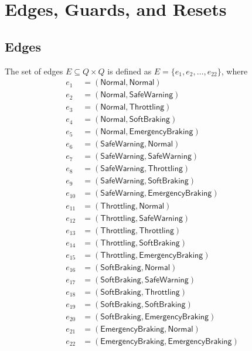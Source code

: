 \documentclass[12pt]{article}
\theoremstyle{definition}
\begin{document}
\section{Edges, Guards, and Resets}

\subsection{Edges}

The set of edges $E \subseteq Q \times Q$ is defined as $E = \{ e_1, e_2, \dots, e_{22} \}$, where
\[
\begin{aligned}
e_1 &= (\mathsf{Normal}, \mathsf{Normal}) \\
e_2 &= (\mathsf{Normal}, \mathsf{SafeWarning}) \\
e_3 &= (\mathsf{Normal}, \mathsf{Throttling}) \\
e_4 &= (\mathsf{Normal}, \mathsf{SoftBraking}) \\
e_5 &= (\mathsf{Normal}, \mathsf{EmergencyBraking}) \\
e_6 &= (\mathsf{SafeWarning}, \mathsf{Normal}) \\
e_7 &= (\mathsf{SafeWarning}, \mathsf{SafeWarning}) \\
e_8 &= (\mathsf{SafeWarning}, \mathsf{Throttling}) \\
e_9 &= (\mathsf{SafeWarning}, \mathsf{SoftBraking}) \\
e_{10} &= (\mathsf{SafeWarning}, \mathsf{EmergencyBraking}) \\
e_{11} &= (\mathsf{Throttling}, \mathsf{Normal}) \\
e_{12} &= (\mathsf{Throttling}, \mathsf{SafeWarning}) \\
e_{13} &= (\mathsf{Throttling}, \mathsf{Throttling}) \\
e_{14} &= (\mathsf{Throttling}, \mathsf{SoftBraking}) \\
e_{15} &= (\mathsf{Throttling}, \mathsf{EmergencyBraking}) \\
e_{16} &= (\mathsf{SoftBraking}, \mathsf{Normal}) \\
e_{17} &= (\mathsf{SoftBraking}, \mathsf{SafeWarning}) \\
e_{18} &= (\mathsf{SoftBraking}, \mathsf{Throttling}) \\
e_{19} &= (\mathsf{SoftBraking}, \mathsf{SoftBraking}) \\
e_{20} &= (\mathsf{SoftBraking}, \mathsf{EmergencyBraking}) \\
e_{21} &= (\mathsf{EmergencyBraking}, \mathsf{Normal}) \\
e_{22} &= (\mathsf{EmergencyBraking}, \mathsf{EmergencyBraking})
\end{aligned}
\]
\end{document}
